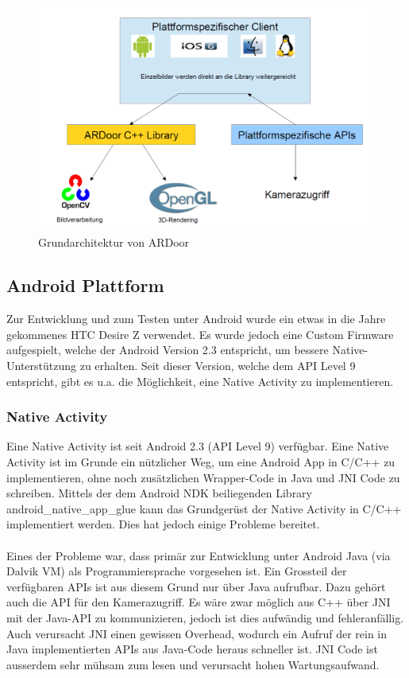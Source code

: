 \documentclass[main.tex]{subfiles}
\begin{document}
\begin{figure}[!ht]
\centering
\includegraphics[scale=0.4]{images/architecture.png} 
\caption{Grundarchitektur von ARDoor}
\label{fig:android-architecture}
\end{figure}

\subsection{Android Plattform}
Zur Entwicklung und zum Testen unter Android wurde ein etwas in die Jahre gekommenes HTC Desire Z verwendet. Es wurde jedoch eine Custom Firmware aufgespielt, welche der Android Version 2.3 entspricht, um bessere Native-Unterstützung zu erhalten. Seit dieser Version, welche dem API Level 9 entspricht, gibt es u.a. die Möglichkeit, eine Native Activity zu implementieren.


\subsubsection{Native Activity}
Eine Native Activity ist seit Android 2.3 (API Level 9) verfügbar. Eine Native Activity ist im Grunde ein nützlicher Weg, um eine Android App in C/C++ zu implementieren, ohne noch zusätzlichen Wrapper-Code in Java und JNI Code zu schreiben. Mittels der dem Android NDK beiliegenden Library android\_native\_app\_glue kann das Grundgerüst der Native Activity in C/C++ implementiert werden. Dies hat jedoch einige Probleme bereitet.

\paragraph{}
Eines der Probleme war, dass primär zur Entwicklung unter Android Java (via Dalvik VM) als Programmiersprache vorgesehen ist. Ein Grossteil der verfügbaren APIs ist aus diesem Grund nur über Java aufrufbar. Dazu gehört auch die API für den Kamerazugriff. Es wäre zwar möglich aus C++ über JNI mit der Java-API zu kommunizieren, jedoch ist dies aufwändig und fehleranfällig. Auch verursacht JNI einen gewissen Overhead, wodurch ein Aufruf der rein in Java implementierten APIs aus Java-Code heraus schneller ist. JNI Code ist ausserdem sehr mühsam zum lesen und verursacht hohen Wartungsaufwand.
\end{document}
